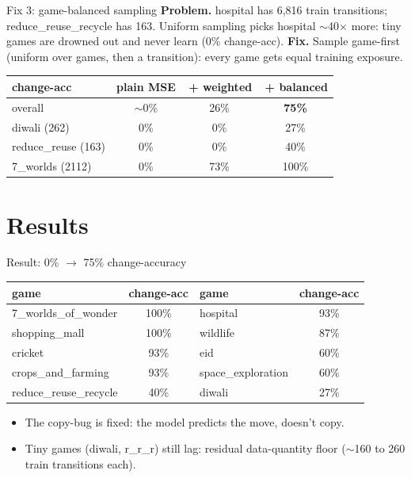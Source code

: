 \documentclass[aspectratio=169,11pt]{beamer}
\newcommand{\code}[1]{{\ttfamily\small #1}}
\newcommand{\good}[1]{\textcolor{good}{#1}}
\newcommand{\bad}[1]{\textcolor{acc}{#1}}
\begin{document}
\begin{frame}{Fix 3: game-balanced sampling}
  \textbf{Problem.} hospital has 6{,}816 train transitions; \code{reduce\_reuse\_recycle}
  has 163. Uniform sampling picks hospital $\sim$40$\times$ more: tiny games are
  \alert{drowned out} and never learn (0\% change-acc).
  \vspace{0.5em}
  \textbf{Fix.} Sample \alert{game-first} (uniform over games, then a transition):
  every game gets equal training exposure.
  \vspace{0.6em}
  \begin{center}
  \begin{tabular}{@{}lccc@{}}
    \toprule
    change-acc & plain MSE & \,+ weighted & \,+ balanced \\
    \midrule
    overall            & \bad{$\sim$0\%} & 26\% & \good{\textbf{75\%}} \\
    diwali (262)       & 0\% & 0\% & 27\% \\
    reduce\_reuse (163)& 0\% & 0\% & 40\% \\
    7\_worlds (2112)   & 0\% & 73\% & \good{100\%} \\
    \bottomrule
  \end{tabular}
  \end{center}
\end{frame}

%
\section{Results}
\begin{frame}{Result: 0\% $\to$ 75\% change-accuracy}
  \centering
  \begin{tabular}{@{}lc@{\hskip 2em}lc@{}}
    \toprule
    game & change-acc & game & change-acc \\
    \midrule
    7\_worlds\_of\_wonder & \good{100\%} & hospital & \good{93\%} \\
    shopping\_mall & \good{100\%} & wildlife & 87\% \\
    cricket & 93\% & eid & 60\% \\
    crops\_and\_farming & 93\% & space\_exploration & 60\% \\
    reduce\_reuse\_recycle & 40\% & diwali & 27\% \\
    \bottomrule
  \end{tabular}
  \vspace{0.8em}
  \begin{itemize}\small
    \item The copy-bug is fixed: the model \good{predicts the move}, doesn't copy.
    \item Tiny games (diwali, r\_r\_r) still lag: \alert{residual data-quantity
          floor} ($\sim$160 to 260 train transitions each).
  \end{itemize}
\end{frame}
\end{document}

